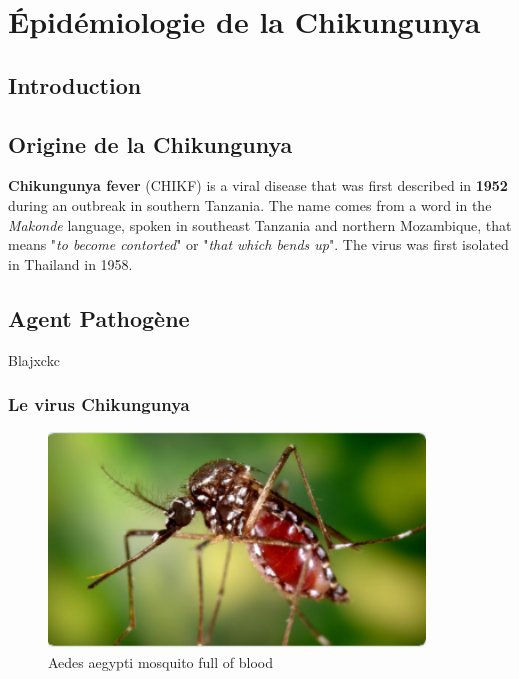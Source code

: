 \chapter{Épidémiologie de la Chikungunya}


\section*{Introduction}

 
\section{Origine de la Chikungunya}
\textbf{Chikungunya fever} (CHIKF) is a viral disease that was first described in \textbf{1952} during an outbreak in southern Tanzania. The name comes from a word in the \textit{Makonde} language, spoken in southeast Tanzania and northern Mozambique, that means "\textit{to become contorted}" or "\textit{that which bends up}". The virus was first isolated in Thailand in 1958.\cite{origin}

\section{Agent Pathogène}

Blajxckc

\subsection{Le virus Chikungunya}

\begin{figure}[!h]
	\begin{center}
		\includegraphics[width=10cm]{images/moustique}
	\end{center}
	\caption{Aedes aegypti mosquito full of blood}
	\label{fig:aedes}
\end{figure}

